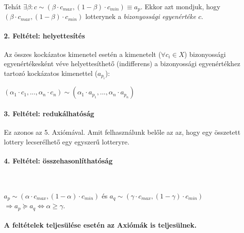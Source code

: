 \documentclass[a4paper,12pt]{article}
\begin{document}
Tehát $\exists \beta: c \sim (\beta\cdot c_{max}, (1-\beta)\cdot c_{min}) \equiv a_p$. Ekkor azt mondjuk, hogy $(\beta\cdot c_{max}, (1-\beta)\cdot c_{min})$ lotterynek a \emph{bizonyossági egyenértéke} $c$.

\paragraph{2. Feltétel: helyettesítés}

Az összes kockázatos kimenetel esetén a kimenetelt ($\forall c_i \in X$) bizonyossági egyenértékesként véve helyettesíthető (indifferens) a bizonyossági egyenértékhez tartozó kockázatos kimenettel ($a_{p_i}$):

$(\alpha_1 \cdot c_1 , ... ,\alpha_n \cdot c_n ) \sim (\alpha_1 \cdot a_{p_1}, ... ,\alpha_n \cdot a_{p_n}) $


\paragraph{3. Feltétel: redukálhatóság}

Ez azonos az 5. Axiómával. Amit felhasználunk belőle az az, hogy egy összetett lottery lecserélhető egy egyszerű lotteryre.

\paragraph{4. Feltétel: összehasonlíthatóság}

\

$a_p \sim (\alpha \cdot c_{max}, (1-\alpha) \cdot c_{min})$ és 
$a_q \sim (\gamma \cdot c_{max}, (1-\gamma) \cdot c_{min})$ $\Rightarrow a_p \succeq a_q \Leftrightarrow \alpha \geq \gamma$. 

\paragraph{A feltételek teljesülése esetén az Axiómák is teljesülnek.}
\end{document}
